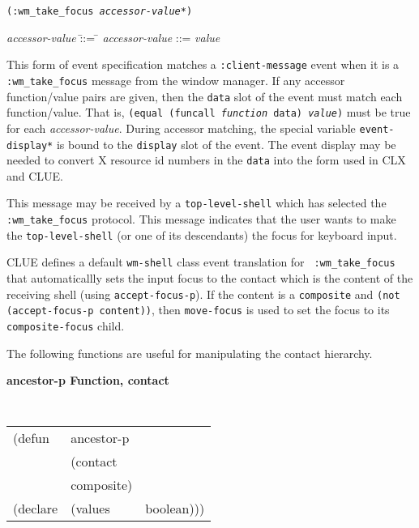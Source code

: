 {\samepage
{}
{\tt (:wm\_take\_focus {\em accessor-value}*)}\\
\hspace*{.75in}
\parbox[t]{5.75in}{
\begin{tabbing}
{\em accessor-value} \= ::= \= \kill
{\em accessor-value} \>::=  {\em value} \\
\end{tabbing}}
}
\begin{flushright}
\parbox[t]{5.75in}{
This
form of event specification matches a {\tt :client-message}
event when it is a {\tt :wm\_take\_focus} message from the window manager.
If
any accessor function/value pairs are
given, then the {\tt data} slot of the event must
match each function/value. That is, {\tt (equal (funcall {\em function}
data) {\em value})} must be true for each {\em accessor-value}.
During accessor matching, the special variable {\tt *event-display*} is
bound to the {\tt display} slot of the event. The event display may be
needed to convert X resource id numbers in the {\tt data} into the form
used in CLX and CLUE.}

\parbox[t]{5.75in}{
This message may be received by a {\tt top-level-shell} which has selected the 
{\tt :wm\_take\_focus} protocol. This message indicates that the user wants to make
the {\tt top-level-shell} (or one of its descendants) the focus for keyboard input.}

\parbox[t]{5.75in}{
CLUE defines a default {\tt wm-shell} class event translation for {\tt
:wm\_take\_focus} that automaticallly sets the input focus to the contact which
is the content of the receiving shell
(using {\tt accept-focus-p}).
If the content is a {\tt composite} and {\tt (not (accept-focus-p content))},
then {\tt move-focus} is used to set the focus to its
{\tt composite-focus} child.
}\end{flushright}


The following functions are useful for manipulating the contact
hierarchy.

{\samepage
{\large {\bf ancestor-p \hfill Function, contact}} 
\begin{flushright} \parbox[t]{6.125in}{
\tt
\begin{tabular}{lll}
\raggedright
(defun & ancestor-p & \\ 
& (contact\\
&  composite) \\
(declare &(values  & boolean)))
\end{tabular}
\rm

}\end{flushright}}

